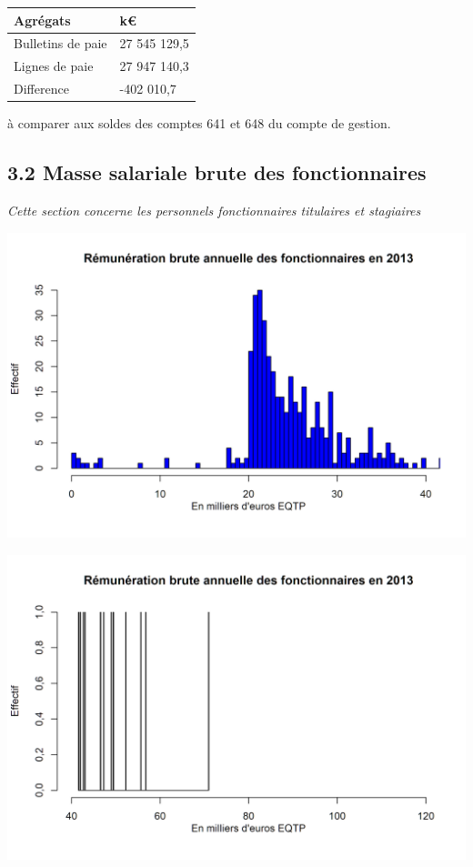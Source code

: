 \begin{longtable}[]{@{}ll@{}}
\toprule
Agrégats & k€\tabularnewline
\midrule
\endhead
Bulletins de paie & 27 545 129,5\tabularnewline
Lignes de paie & 27 947 140,3\tabularnewline
Difference & -402 010,7\tabularnewline
\bottomrule
\end{longtable}

à comparer aux soldes des comptes 641 et 648 du compte de gestion.

\hypertarget{masse-salariale-brute-des-fonctionnaires-1}{%
\subsection{3.2 Masse salariale brute des
fonctionnaires}\label{masse-salariale-brute-des-fonctionnaires-1}}

\emph{Cette section concerne les personnels fonctionnaires titulaires et
stagiaires}

\includegraphics{altair_files/figure-latex/unnamed-chunk-76-1.png}

\includegraphics{altair_files/figure-latex/unnamed-chunk-76-2.png}

